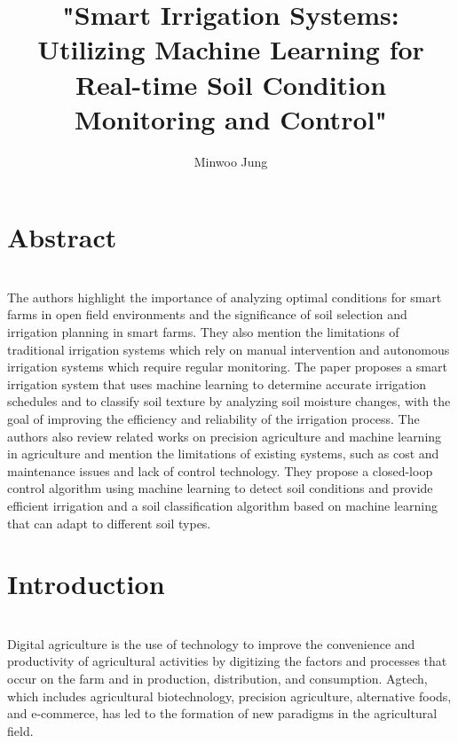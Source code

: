 \documentclass[11pt]{article}
\title{"Smart Irrigation Systems: Utilizing Machine Learning for Real-time Soil Condition Monitoring and Control"}
\author{Minwoo Jung}
\begin{document}
\maketitle

\section{Abstract}
\indent \\The authors highlight the importance of analyzing optimal conditions for smart farms in open field environments and the significance of soil selection and irrigation planning in smart farms. They also mention the limitations of traditional irrigation systems which rely on manual intervention and autonomous irrigation systems which require regular monitoring. The paper proposes a smart irrigation system that uses machine learning to determine accurate irrigation schedules and to classify soil texture by analyzing soil moisture changes, with the goal of improving the efficiency and reliability of the irrigation process. The authors also review related works on precision agriculture and machine learning in agriculture and mention the limitations of existing systems, such as cost and maintenance issues and lack of control technology. They propose a closed-loop control algorithm using machine learning to detect soil conditions and provide efficient irrigation and a soil classification algorithm based on machine learning that can adapt to different soil types.

\section{Introduction}
\indent \\Digital agriculture is the use of technology to improve the convenience and productivity of agricultural activities by digitizing the factors and processes that occur on the farm and in production, distribution, and consumption. Agtech, which includes agricultural biotechnology, precision agriculture, alternative foods, and e-commerce, has led to the formation of new paradigms in the agricultural field.
\end{document}

